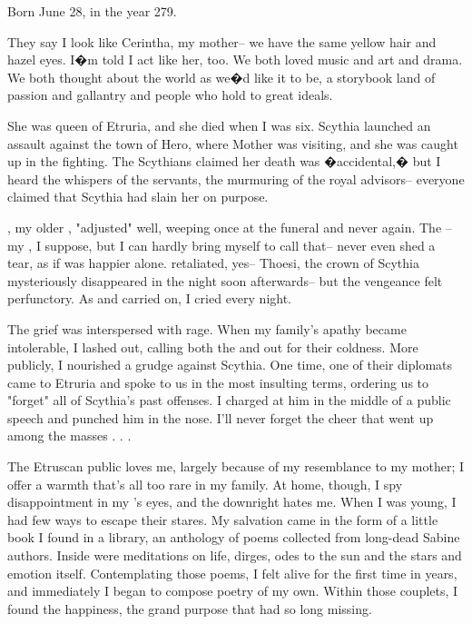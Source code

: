 \documentclass[char]{Kos}
\begin{document}
\name{\cPoet{}}

Born June 28, in the year 279.

They say I look like Cerintha, my mother-- we have the same yellow hair and hazel eyes. I�m told I act like her, too. We both loved music and art and drama. We both thought about the world as we�d like it to be, a storybook land of passion and gallantry and people who hold to great ideals. 

She was queen of Etruria, and she died when I was six. Scythia launched an assault against the town of Hero, where Mother was visiting, and she was caught up in the fighting. The Scythians claimed her death was �accidental,� but I heard the whispers of the servants, the murmuring of the royal advisors-- everyone claimed that Scythia had slain her on purpose. 

\cGroom{\nickname}, my older \cGroom{\sibling}, "adjusted" well, weeping once at the funeral and never again. The \cEtruriaKing{\monarch}-- my \cEtruriaKing{\parent}, I suppose, but I can hardly bring myself to call \cEtruriaKing{\them} that-- never even shed a tear, as if \cEtruriaKing{\they} was happier alone. \cEtruriaKing{\They} retaliated, yes-- Thoesi, the crown  of Scythia mysteriously disappeared in the night soon afterwards-- but the vengeance felt perfunctory. As \cEtruriaKing{\they} and \cGroom{\nickname} carried on, I cried every night.

The grief was interspersed with rage. When my family's apathy became intolerable, I lashed out, calling both the \cEtruriaKing{\monarch} and \cGroom{\nickname} out for their coldness. More publicly, I nourished a grudge against Scythia. One time, one of their diplomats came to Etruria and spoke to us in the most insulting terms, ordering us to "forget" all of Scythia's past offenses. I charged at him in the middle of a public speech and punched him in the nose. I'll never forget the cheer that went up among the masses . . .

The Etruscan public loves me, largely because of my resemblance to my mother; I offer a warmth that's all too rare in my family. At home, though, I spy disappointment in my \cGroom{\sibling}'s eyes, and the \cEtruriaKing{\monarch} downright hates me. When I was young, I had few ways to escape their stares. My salvation came in the form of a little book I found in a library, an anthology of poems collected from long-dead Sabine authors. Inside were meditations on life, dirges, odes to the sun and the stars and emotion itself. Contemplating those poems, I felt alive for the first time in years, and immediately I began to compose poetry of my own. Within those couplets, I found the happiness, the grand purpose that had so long missing.
\end{document}
